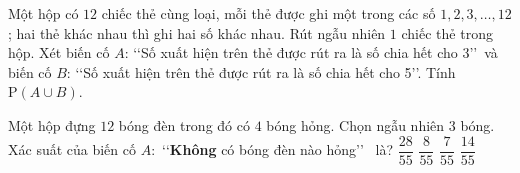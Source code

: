\begin{bt}%
	Một hộp có $12$ chiếc thẻ cùng loại, mỗi thẻ được ghi một trong các số $1,2,3, \ldots, 12$; hai thẻ khác nhau thì ghi hai số khác nhau. Rút ngẫu nhiên $1$ chiếc thẻ trong hộp. Xét biến cố $A$: \lq\lq Số xuất hiện trên thẻ được rút ra là số chia hết cho $3$\rq\rq \, và biến cố $B$: \lq\lq Số xuất hiện trên thẻ được rút ra là số chia hết cho 5\rq\rq. Tính $\mathrm{P}(A \cup B)$.
\end{bt}

\begin{ex}%
	Một  hộp đựng $ 12 $ bóng đèn trong đó có $ 4 $ bóng hỏng. Chọn ngẫu nhiên $ 3 $ bóng. Xác suất của biến cố $A\colon$ \lq\lq \textbf{Không} có bóng đèn nào hỏng\rq\rq~ là?
	 \choice
		{$\dfrac{28}{55}$} 
		 {$\dfrac{8}{55}$}
		{$\dfrac{7}{55}$} 
		 {\True $\dfrac{14}{55}$}
\end{ex}

